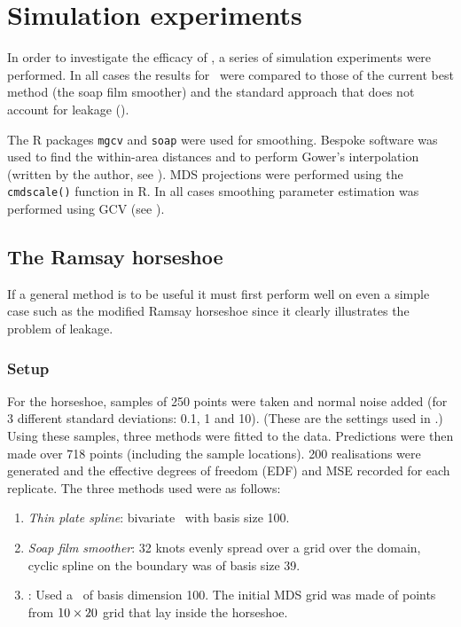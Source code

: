 \section{Simulation experiments}
\label{mdssims}

In order to investigate the efficacy of \mdsap, a series of simulation experiments were performed. In all cases the results for \mdsap\ were compared to those of the current best method (the soap film smoother) and the standard approach that does not account for leakage (\tprs).

The \textsf{R} packages \texttt{mgcv} and \texttt{soap} were used for smoothing. Bespoke software was used to find the within-area distances and to perform Gower's interpolation (written by the author, see ). MDS projections were performed using the \texttt{cmdscale()} function in \textsf{R}. In all cases smoothing parameter estimation was performed using GCV (see )\label{cor-soft3}.

\subsection{The Ramsay horseshoe}

If a general method is to be useful it must first perform well on even a simple case such as the modified Ramsay horseshoe since it clearly illustrates the problem of leakage.

\subsubsection{Setup}

For the horseshoe, samples of 250 points were taken and normal noise added (for 3 different standard deviations: 0.1, 1 and 10). (These are the settings used in \cite{soap}.) Using these samples, three methods were fitted to the data. Predictions were then made over 718 points (including the sample locations). 200 realisations were generated and the effective degrees of freedom\label{cor-r35-1} (EDF) and MSE recorded for each replicate. The three methods used were as follows:

\begin{enumerate}
\item \emph{Thin plate spline}: bivariate \tprs\  with basis size 100.
\item \emph{Soap film smoother}: 32 knots evenly spread over a grid over the domain, cyclic spline on the boundary was of basis size 39.
\item \emph{\mdsap}: Used a \tprss\ of basis dimension 100. The initial MDS grid was made of points from $10\times 20$ grid that lay inside the horseshoe.
\end{enumerate} 

